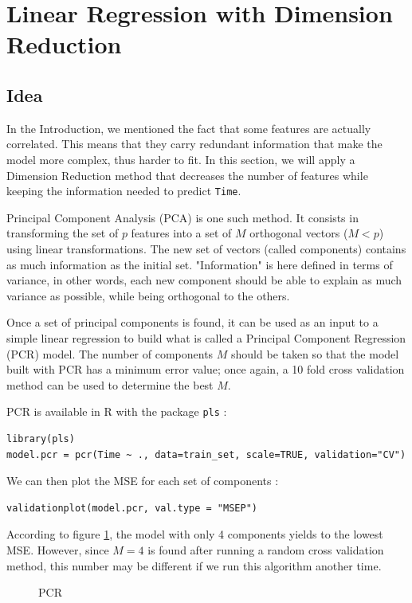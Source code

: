\documentclass[]{report}
\newcommand{\inputtikz}[2]{%
	\scalebox{#1}{}  
}
\begin{document}
\section{Linear Regression with Dimension Reduction}
\subsection{Idea}
In the Introduction, we mentioned the fact that some features are actually correlated. This means that they carry redundant information that make the model more complex, thus harder to fit. In this section, we will apply a Dimension Reduction method that decreases the number of features while keeping the information needed to predict \texttt{Time}.

Principal Component Analysis (PCA) is one such method. It consists in transforming the set of $p$ features into a set of $M$ orthogonal vectors ($M < p$) using linear transformations. The new set of vectors (called components) contains as much information as the initial set. "Information" is here defined in terms of variance, in other words, each new component should be able to explain as much variance as possible, while being orthogonal to the others.

Once a set of principal components is found, it can be used as an input to a simple linear regression to build what is called a Principal Component Regression (PCR) model. The number of components $M$ should be taken so that the model built with PCR has a minimum error value; once again, a 10 fold cross validation method can be used to determine the best $M$.

PCR is available in R with the package \texttt{pls} :
\begin{lstlisting}
library(pls)
model.pcr = pcr(Time ~ ., data=train_set, scale=TRUE, validation="CV")
\end{lstlisting}

We can then plot the MSE for each set of components :
\begin{lstlisting}
validationplot(model.pcr, val.type = "MSEP")
\end{lstlisting}

According to figure \ref{fig:pcr_cv}, the model with only 4 components yields to the lowest MSE. However, since $M = 4$ is found after running a random cross validation method, this number may be different if we run this algorithm another time.

\begin{figure}[!h]
	\centering
	\inputtikz{0.5}{Figures/pcr_cv.tex}
	\caption{PCR}
	\label{fig:pcr_cv}
\end{figure}
\end{document}
